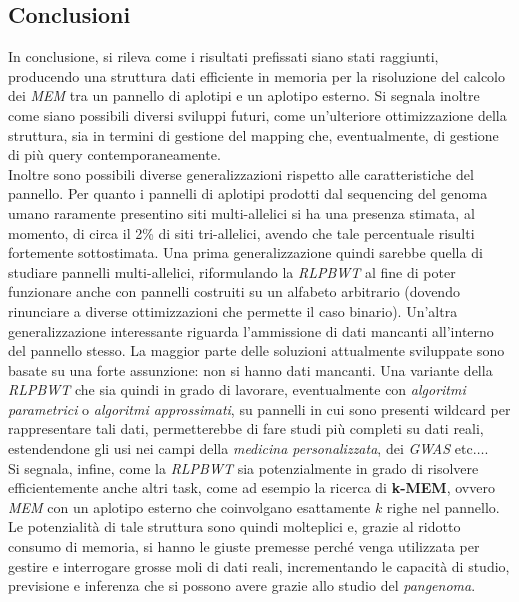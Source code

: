 \documentclass[a4paper,11pt, oneside]{article}
\begin{document}
\subsection*{Conclusioni}
In conclusione, si rileva come i risultati prefissati siano stati raggiunti,
producendo una struttura dati efficiente in memoria per la risoluzione del
calcolo dei \textit{MEM} tra un pannello di aplotipi e un aplotipo
esterno.  
Si segnala inoltre come siano possibili diversi sviluppi futuri, come
un'ulteriore ottimizzazione della struttura, sia in termini 
di gestione del mapping che, eventualmente, di gestione di più query
contemporaneamente. \\
Inoltre sono possibili diverse generalizzazioni rispetto alle caratteristiche
del pannello. Per quanto i pannelli di aplotipi prodotti dal sequencing del
genoma umano raramente presentino siti multi-allelici si ha una 
presenza stimata, al momento, di circa il 2\% di siti tri-allelici, avendo che
tale percentuale risulti fortemente sottostimata. Una prima generalizzazione
quindi sarebbe quella di studiare pannelli multi-allelici, riformulando la
\textit{RLPBWT} al fine di poter funzionare anche con pannelli costruiti su un
alfabeto arbitrario (dovendo rinunciare a diverse ottimizzazioni che permette il
caso binario). Un'altra generalizzazione interessante riguarda l'ammissione di
dati mancanti all'interno del pannello stesso. La maggior parte delle soluzioni
attualmente sviluppate sono basate su una forte assunzione: non si hanno dati
mancanti. Una variante della \textit{RLPBWT} che sia quindi in grado di
lavorare, eventualmente con \textit{algoritmi parametrici} o \textit{algoritmi
  approssimati}, 
su pannelli in cui sono presenti wildcard per rappresentare tali dati,
permetterebbe di fare studi più completi su dati reali, estendendone gli usi nei
campi della \textit{medicina personalizzata}, dei \textit{GWAS} etc$\ldots$.\\ 
Si segnala, infine, come la \textit{RLPBWT} sia potenzialmente in grado di
risolvere 
efficientemente anche altri task, come ad esempio la ricerca di \textbf{k-MEM},
ovvero \textit{MEM} con un aplotipo esterno che coinvolgano
esattamente $k$ righe nel pannello. \\
Le potenzialità di tale struttura sono quindi molteplici e, grazie al ridotto
consumo di memoria, si hanno le giuste premesse perché venga utilizzata per
gestire e interrogare grosse moli di dati reali, incrementando le capacità di
studio, previsione e inferenza che si possono avere grazie allo studio del
\textit{pangenoma}.
\end{document}

